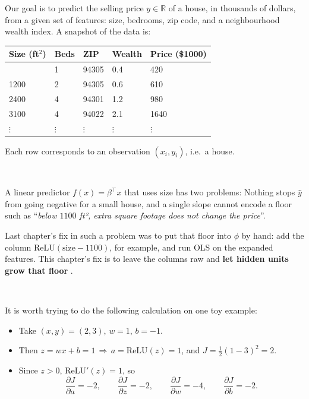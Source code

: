 \documentclass[
]{book}
\newcounter{none} %
\begin{document}
Our goal is to predict the selling price \(y\in\mathbb{R}\) of a house, in thousands of dollars, from a given set of features: size, bedrooms, zip code, and a neighbourhood wealth index. A snapshot of the data is:

{\def\LTcaptype{none} %
\begin{longtable}[]{@{}lllll@{}}
\toprule\noalign{}
Size (ft\(^2\)) & Beds & ZIP & Wealth & Price (\$1000) \\
\midrule\noalign{}
\endhead
\bottomrule\noalign{}
\endlastfoot
850 & 1 & 94305 & 0.4 & 420 \\
1200 & 2 & 94305 & 0.6 & 610 \\
2400 & 4 & 94301 & 1.2 & 980 \\
3100 & 4 & 94022 & 2.1 & 1640 \\
\(\vdots\) & \(\vdots\) & \(\vdots\) & \(\vdots\) & \(\vdots\) \\
\end{longtable}
}

Each row corresponds to an observation \((x_{i},y_{i})\), i.e.~a house.

~

A linear predictor \(f(x)=\beta^\top x\) that uses size has two problems: Nothing stops \(\hat y\) from going negative for a small house, and a single slope cannot encode a floor such as ``\emph{below \(1100\) ft², extra square footage does not change the price}''.

Last chapter's fix in such a problem was to put that floor into \(\phi\) by hand: add the column \(\mathrm{ReLU}(\mathrm{size}-1100)\), for example, and run OLS on the expanded features. This chapter's fix is to leave the columns raw and \textbf{let hidden units grow that floor} .

~

It is worth trying to do the following calculation on one toy example:

\begin{itemize}
\item
  Take \((x,y)=(2,3)\), \(w=1\), \(b=-1\).
\item
  Then \(z=wx+b=1 \, \Rightarrow \, a=\mathrm{ReLU}(z)=1\), and \(J=\tfrac12(1-3)^2=2\).
\item
  Since \(z>0\), \(\mathrm{ReLU}'(z)=1\), so
  \[
  \frac{\partial J}{\partial a}=-2,
  \qquad
  \frac{\partial J}{\partial z}=-2,
  \qquad
  \frac{\partial J}{\partial w}=-4,
  \qquad
  \frac{\partial J}{\partial b}=-2.
  \]
\end{itemize}
\end{document}
